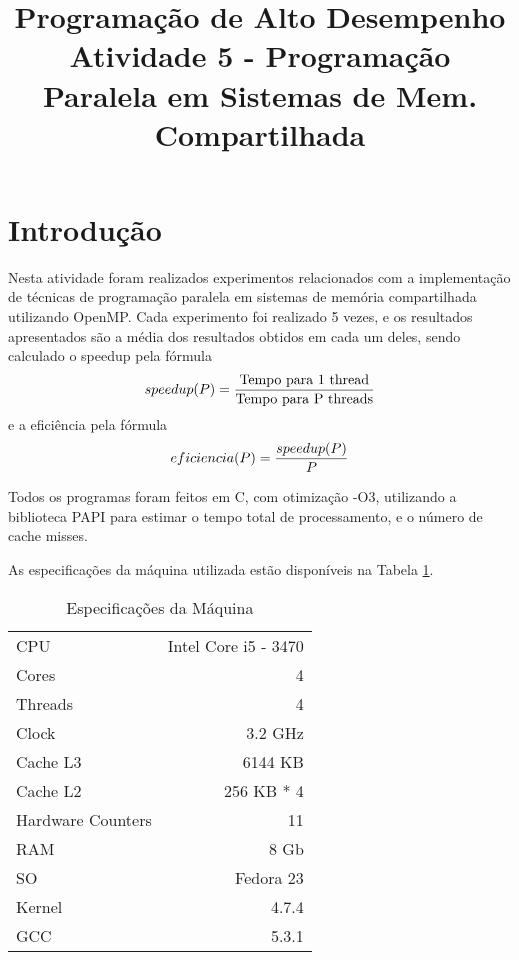 \documentclass[conference]{IEEEtran}
\begin{document}
\title{Programação de Alto Desempenho\\
\large Atividade 5 - Programação Paralela em Sistemas de Mem. Compartilhada}

\author{
 }

\maketitle


\section{Introdução}
Nesta atividade foram realizados experimentos relacionados com a implementação de técnicas de programação paralela em sistemas de memória compartilhada utilizando OpenMP.
Cada experimento foi realizado 5 vezes, e os resultados apresentados são a média dos resultados obtidos em cada um deles, sendo calculado o speedup pela fórmula $$speedup(P) = {{\textrm{Tempo para 1 thread} }\over{\textrm{Tempo para P threads} }}$$ e a eficiência pela fórmula $$eficiencia(P) = {{speedup(P)}\over{P}}$$

Todos os programas foram feitos em C, com otimização -O3, utilizando a biblioteca PAPI para estimar o tempo total de processamento, e o número de cache misses.


As especificações da máquina utilizada estão disponíveis na Tabela \ref{tab:cpu}.

\begin{table}[htb!]
\centering
\caption{Especificações da Máquina}
\label{tab:cpu}
\begin{tabular}{lr}
 CPU & Intel Core i5 - 3470\\
 Cores & 4\\
 Threads & 4\\
 Clock & 3.2 GHz\\
 Cache L3 & 6144 KB \\
 Cache L2 & 256 KB * 4 \\
 Hardware Counters & 11 \\
 RAM & 8 Gb \\
 SO & Fedora 23 \\
 Kernel & 4.7.4 \\
 GCC & 5.3.1\\

\end{tabular}
\end{table}
\end{document}
